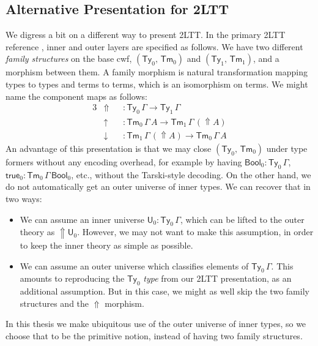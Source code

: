 \documentclass[12pt,a4paper,twoside,openany]{book}
\theoremstyle{remark}
\theoremstyle{definition}
\theoremstyle{theorem}
\newcommand{\ms}[1]{\mathsf{#1}}
\newcommand{\Tm}{\mathsf{Tm}}
\newcommand{\Ty}{\mathsf{Ty}}
\newcommand{\U}{\mathsf{U}}
\newcommand{\Lift}{\Uparrow}
\newcommand{\Bool}{\ms{Bool}}
\newcommand{\true}{\ms{true}}
\newcommand{\up}{\uparrow}
\newcommand{\down}{\downarrow}
\begin{document}
\subsection{Alternative Presentation for 2LTT}

We digress a bit on a different way to present 2LTT. In the primary 2LTT
reference \cite{twolevel}, inner and outer layers are specified
as follows. We have two different \emph{family structures} on the base
cwf, $(\Ty_0,\,\Tm_0)$ and $(\Ty_1,\,\Tm_1)$, and a morphism between them. A
family morphism is natural transformation mapping types to types and terms to
terms, which is an isomorphism on terms. We might name the component maps
as follows:
\begin{alignat*}{3}
  &\Lift &&: \Ty_0\,\Gamma \to \Ty_1\,\Gamma \\
  &\up   &&: \Tm_0\,\Gamma\,A \to \Tm_1\,\Gamma\,(\Lift\!A)\\
  &\down &&: \Tm_1\,\Gamma\,(\Lift\!A) \to \Tm_0\,\Gamma\,A
\end{alignat*}
An advantage of this presentation is that we may close $(\Ty_0,\,\Tm_0)$ under
type formers without any encoding overhead, for example by having $\Bool_0 :
\Ty_0\,\Gamma$, $\true_0 : \Tm_0\,\Gamma\,\Bool_0$, etc., without the
Tarski-style decoding. On the other hand, we do not automatically get an outer
universe of inner types. We can recover that in two ways:
\begin{itemize}
\item
  We can assume an inner universe $\U_0 : \Ty_0\,\Gamma$, which can be lifted to the
  outer theory as $\Lift\!\U_0$. However, we may not want to make this
  assumption, in order to keep the inner theory as simple as possible.
\item
  We can assume an outer universe which classifies elements of
  $\Ty_0\,\Gamma$. This amounts to reproducing the $\Ty_0$ \emph{type} from our
  2LTT presentation, as an additional assumption. But in this case, we might as
  well skip the two family structures and the $\Lift$ morphism.
\end{itemize}
In this thesis we make ubiquitous use of the outer universe of inner types, so
we choose that to be the primitive notion, instead of having two family
structures.
\end{document}
